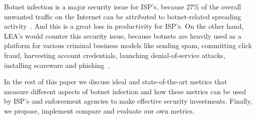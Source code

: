 Botnet infection is a major security issue for ISP's, because 27\% of the overall unwanted traffic on the Internet can be attributed to botnet-related spreading activity~\cite{AM2006}. And this is a great loss in productivity for ISP's. On the other hand, LEA's would counter this security issue, because botnets are heavily used as a platform for various criminal business models like sending spam, committing click fraud, harvesting account credentials, launching denial-of-service attacks, installing scareware and phishing~\cite{AR2013}.

In the rest of this paper we discuss ideal and state-of-the-art metrics that measure different aspects of botnet infection and how these metrics can be used by ISP's and enforcement agencies to make effective security investments. Finally, we propose, implement compare and evaluate our own metrics.

